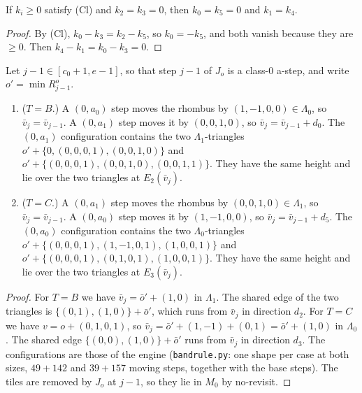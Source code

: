 \documentclass[11pt]{article}
\theoremstyle{definition}\newtheorem{definition}[theorem]{Definition}\newtheorem{remark}[theorem]{Remark}
\begin{document}
\begin{lemma}\label{lem:twozero}
If $k_i\ge0$ satisfy (Cl) and $k_2=k_3=0$, then $k_0=k_5=0$ and $k_1=k_4$.
\end{lemma}
\begin{proof}
By (Cl), $k_0-k_3=k_2-k_5$, so $k_0=-k_5$, and both vanish because they are $\ge0$. Then $k_4-k_1=k_0-k_3=0$.
\end{proof}

\begin{lemma}\label{lem:bandstep}
Let $j-1\in[c_0+1,e-1]$, so that step $j-1$ of $J_o$ is a class-0 a-step, and write $o'=\min R^o_{j-1}$.
\begin{enumerate}
\item ($T=B$.) A $(0,a_0)$ step moves the rhombus by $(1,-1,0,0)\in\Lambda_0$, so $\bar v_j=\bar v_{j-1}$. A $(0,a_1)$ step moves it by $(0,0,1,0)$, so $\bar v_j=\bar v_{j-1}+d_0$. The $(0,a_1)$ configuration contains the two $\Lambda_1$-triangles $o'+\{0,(0,0,0,1),(0,0,1,0)\}$ and $o'+\{(0,0,0,1),(0,0,1,0),(0,0,1,1)\}$. They have the same height and lie over the two triangles at $E_2(\bar v_j)$.
\item ($T=C$.) A $(0,a_1)$ step moves the rhombus by $(0,0,1,0)\in\Lambda_1$, so $\bar v_j=\bar v_{j-1}$. A $(0,a_0)$ step moves it by $(1,-1,0,0)$, so $\bar v_j=\bar v_{j-1}+d_5$. The $(0,a_0)$ configuration contains the two $\Lambda_0$-triangles $o'+\{(0,0,0,1),(1,-1,0,1),(1,0,0,1)\}$ and $o'+\{(0,0,0,1),(0,1,0,1),(1,0,0,1)\}$. They have the same height and lie over the two triangles at $E_3(\bar v_j)$.
\end{enumerate}
\end{lemma}
\begin{proof}
For $T=B$ we have $\bar v_j=\bar o'+(1,0)$ in $\Lambda_1$. The shared edge of the two triangles is $\{(0,1),(1,0)\}+\bar o'$, which runs from $\bar v_j$ in direction $d_2$. For $T=C$ we have $v=o+(0,1,0,1)$, so $\bar v_j=\bar o'+(1,-1)+(0,1)=\bar o'+(1,0)$ in $\Lambda_0$. The shared edge $\{(0,0),(1,0)\}+\bar o'$ runs from $\bar v_j$ in direction $d_3$. The configurations are those of the engine (\texttt{bandrule.py}: one shape per case at both sizes, $49+142$ and $39+157$ moving steps, together with the base steps). The tiles are removed by $J_o$ at $j-1$, so they lie in $M_0$ by no-revisit.
\end{proof}
\end{document}
